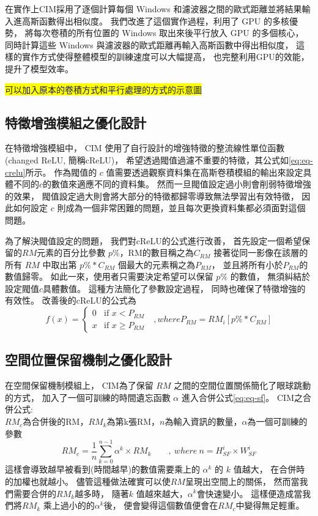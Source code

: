 \documentclass[class=NCU_thesis, crop=false]{standalone}
\begin{document}
	在實作上CIM採用了逐個計算每個 Windows 和濾波器之間的歐式距離並將結果輸入進高斯函數得出相似度。
	我們改進了這個實作過程，利用了 GPU 的多核優勢，
	將每次卷積的所有位置的 Windows 取出來後平行放入 GPU 的多個核心，
	同時計算這些 Windows 與濾波器的歐式距離再輸入高斯函數中得出相似度，
	這樣的實作方式使得整體模型的訓練速度可以大幅提高，
	也完整利用GPU的效能，提升了模型效率。

	\colorbox {yellow}{可以加入原本的卷積方式和平行處理的方式的示意圖}

	\subsection{特徵增強模組之優化設計}
	在特徵增強模組中，
	CIM 使用了自行設計的增強特徵的整流線性單位函數(changed ReLU, 簡稱cReLU)，
	希望透過閥值過濾不重要的特徵，其公式如\cref{eq:eq-crelu}所示。
	作為閥值的 $c$ 值需要透過觀察資料集在高斯卷積模組的輸出來設定具體不同的$c$的數值來適應不同的資料集。
	然而一旦閥值設定過小則會削弱特徵增強的效果，
	閥值設定過大則會將大部分的特徵都歸零導致無法學習出有效特徵，
	因此如何設定 $c$ 則成為一個非常困難的問題，並且每次更換資料集都必須面對這個問題。

	為了解決閥值設定的問題，
	我們對cReLU的公式進行改善，
	首先設定一個希望保留的$RM$元素的百分比參數 $p\%$，RM的數目稱之為$C_{RM}$
	接著從同一影像在該層的所有 $RM$ 中取出第 $p\% * C_{RM}$  個最大的元素稱之為$P_{RM}$，
	並且將所有小於$P_{RM}$的數值歸零。
	如此一來，使用者只需要決定希望可以保留 $p\%$ 的數值，
	無須糾結於設定閥值$c$具體數值。
	這種方法簡化了參數設定過程，
	同時也確保了特徵增強的有效性。
	改善後的cReLU的公式為\\
	\begin{equation}
	    \label{eq:eq-cReLUPercent}
	    f(x)= 
	    \begin{cases}
	        0 & \text{if  $x < P_{RM}$ }\\
	        x & \text{if  $x \geq P_{RM}$}
	    \end{cases}, where P_{RM} = RM_{i}\left[ p\% * C_{RM} \right]
	\end{equation}


	\subsection{空間位置保留機制之優化設計}
	在空間保留機制模組上，
	CIM為了保留 $RM$ 之間的空間位置關係簡化了眼球跳動的方式，
	加入了一個可訓練的時間遺忘函數 $\alpha$ 進入合併公式\cref{eq:eq-sf}。
	CIM之合併公式:\\
		$RM_{c}$為合併後的RM，$RM_{k}$為第k張RM，$n$為輸入資訊的數量，$\alpha$為一個可訓練的參數
		\begin{equation}
		    \label{eq:eq-sf}
		    RM_{c}=\frac{1}{n} \sum_{k = 0}^{n-1} \alpha^{k} \times RM_{k}  \qquad ,\ where\ n = \textit{H}^{i}_{SF} \times \textit{W}^{i}_{SF}
		\end{equation}
	這樣會導致越早被看到(時間越早)的數值需要乘上的 $\alpha^{k}$ 的 $k$ 值越大，
	在合併時的加權也就越小。
	儘管這種做法確實可以使$RM$呈現出空間上的關係，
	然而當我們需要合併的$RM_{k}$越多時，
	隨著$k$ 值越來越大，$\alpha^{k}$會快速變小。
	這樣便造成當我們將$RM_{k}$ 乘上過小的的$\alpha^{k}$後，
	便會變得這個數值便會在$RM_{c}$中變得無足輕重。
	
\end{document}
